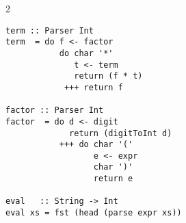 \documentclass{article}
\def \columncount {2}
\begin{document}
\begin{multicols*}{\columncount}
\begin{outline}[longenum]
\begin{lstlisting}
term :: Parser Int
term  = do f <- factor
           do char '*'
              t <- term
              return (f * t)
            +++ return f

factor :: Parser Int
factor  = do d <- digit
             return (digitToInt d)
           +++ do char '('
                  e <- expr
                  char ')'
                  return e

eval   :: String -> Int
eval xs = fst (head (parse expr xs))
\end{lstlisting} \vspace{-0.2cm}


\end{outline}
\end{multicols*}
\end{document}
